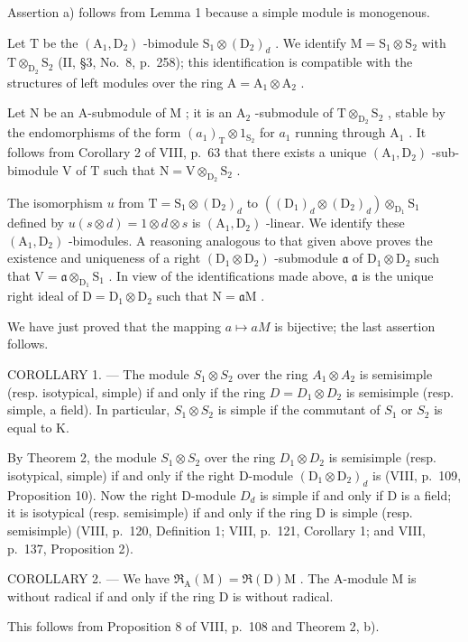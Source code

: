 Assertion a) follows from Lemma 1 because a simple module is monogenous.

Let \(\mathrm{T}\) be the \((\mathrm{A}_1, \mathrm{D}_2)\) -bimodule \(\mathrm{S}_1 \otimes (\mathrm{D}_2)_d\) . We identify \(\mathrm{M} = \mathrm{S}_1 \otimes \mathrm{S}_2\) with \(\mathrm{T} \otimes_{\mathrm{D}_2} \mathrm{S}_2\) (II, §3, No.~8, p.~258); this identification is compatible with the structures of left modules over the ring \(\mathrm{A} = \mathrm{A}_1 \otimes \mathrm{A}_2\) .

Let \(\mathrm{N}\) be an A-submodule of \(\mathrm{M}\) ; it is an \(\mathrm{A}_2\) -submodule of \(\mathrm{T} \otimes_{\mathrm{D}_2} \mathrm{S}_2\) , stable by the endomorphisms of the form \((a_1)_\mathrm{T} \otimes 1_{\mathrm{S}_2}\) for \(a_1\) running through \(\mathrm{A}_1\) . It follows from Corollary 2 of VIII, p.~63 that there exists a unique \((\mathrm{A}_1, \mathrm{D}_2)\) -sub-bimodule \(\mathrm{V}\) of \(\mathrm{T}\) such that \(\mathrm{N} = \mathrm{V} \otimes_{\mathrm{D}_2} \mathrm{S}_2\) .

The isomorphism \(u\) from \(\mathrm{T} = \mathrm{S}_1 \otimes (\mathrm{D}_2)_d\) to \(((\mathrm{D}_1)_d \otimes (\mathrm{D}_2)_d) \otimes_{\mathrm{D}_1} \mathrm{S}_1\) defined by \(u(s \otimes d) = 1 \otimes d \otimes s\) is \((\mathrm{A}_1, \mathrm{D}_2)\) -linear. We identify these \((\mathrm{A}_1, \mathrm{D}_2)\) -bimodules. A reasoning analogous to that given above proves the existence and uniqueness of a right \((\mathrm{D}_1 \otimes \mathrm{D}_2)\) -submodule \(\mathfrak{a}\) of \(\mathrm{D}_1 \otimes \mathrm{D}_2\) such that \(\mathrm{V} = \mathfrak{a} \otimes_{\mathrm{D}_1} \mathrm{S}_1\) . In view of the identifications made above, \(\mathfrak{a}\) is the unique right ideal of \(\mathrm{D} = \mathrm{D}_1 \otimes \mathrm{D}_2\) such that \(\mathrm{N} = \mathfrak{a}\mathrm{M}\) .

We have just proved that the mapping \(a \mapsto aM\) is bijective; the last assertion follows.

COROLLARY 1. --- The module \(S_{1} \otimes S_{2}\) over the ring \(A_{1} \otimes A_{2}\) is semisimple (resp. isotypical, simple) if and only if the ring \(D = D_{1} \otimes D_{2}\) is semisimple (resp. simple, a field). In particular, \(S_{1} \otimes S_{2}\) is simple if the commutant of \(S_{1}\) or \(S_{2}\) is equal to K.

By Theorem 2, the module \(S_{1} \otimes S_{2}\) over the ring \(D_{1} \otimes D_{2}\) is semisimple (resp. isotypical, simple) if and only if the right D-module \((\mathrm{D}_{1} \otimes \mathrm{D}_{2})_{d}\) is (VIII, p.~109, Proposition 10). Now the right D-module \(D_{d}\) is simple if and only if D is a field; it is isotypical (resp. semisimple) if and only if the ring D is simple (resp. semisimple) (VIII, p.~120, Definition 1; VIII, p.~121, Corollary 1; and VIII, p.~137, Proposition 2).

COROLLARY 2. --- We have \(\mathfrak{R}_{\mathrm{A}}(\mathrm{M}) = \mathfrak{R}(\mathrm{D})\mathrm{M}\) . The A-module M is without radical if and only if the ring D is without radical.

This follows from Proposition 8 of VIII, p.~108 and Theorem 2, b).

